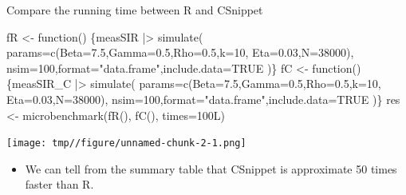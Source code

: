 \documentclass[
  ignorenonframetext,
  aspectratio=169,
  t]{beamer}
\newenvironment{Shaded}{\begin{snugshade}}{\end{snugshade}}
\newcommand{\AttributeTok}[1]{\textcolor[rgb]{0.40,0.45,0.13}{#1}}
\newcommand{\ConstantTok}[1]{\textcolor[rgb]{0.56,0.35,0.01}{#1}}
\newcommand{\ControlFlowTok}[1]{\textcolor[rgb]{0.00,0.23,0.31}{#1}}
\newcommand{\DecValTok}[1]{\textcolor[rgb]{0.68,0.00,0.00}{#1}}
\newcommand{\FloatTok}[1]{\textcolor[rgb]{0.68,0.00,0.00}{#1}}
\newcommand{\FunctionTok}[1]{\textcolor[rgb]{0.28,0.35,0.67}{#1}}
\newcommand{\NormalTok}[1]{\textcolor[rgb]{0.00,0.23,0.31}{#1}}
\newcommand{\OtherTok}[1]{\textcolor[rgb]{0.00,0.23,0.31}{#1}}
\newcommand{\SpecialCharTok}[1]{\textcolor[rgb]{0.37,0.37,0.37}{#1}}
\newcommand{\StringTok}[1]{\textcolor[rgb]{0.13,0.47,0.30}{#1}}
\providecommand{\tightlist}{%
  \setlength{\itemsep}{0pt}\setlength{\parskip}{0pt}}\usepackage{longtable,booktabs,array}
\theoremstyle{definition}
\begin{document}
\begin{frame}{Compare the running time between
R and CSnippet}
\label{compare-the-running-time-between-r-and-csnippet}
\begin{Shaded}
\begin{Highlighting}[]
\NormalTok{fR }\OtherTok{\textless{}{-}} \ControlFlowTok{function}\NormalTok{() \{measSIR }\SpecialCharTok{|\textgreater{}}
      \FunctionTok{simulate}\NormalTok{(}
        \AttributeTok{params=}\FunctionTok{c}\NormalTok{(}\AttributeTok{Beta=}\FloatTok{7.5}\NormalTok{,}\AttributeTok{Gamma=}\FloatTok{0.5}\NormalTok{,}\AttributeTok{Rho=}\FloatTok{0.5}\NormalTok{,}\AttributeTok{k=}\DecValTok{10}\NormalTok{,}
          \AttributeTok{Eta=}\FloatTok{0.03}\NormalTok{,}\AttributeTok{N=}\DecValTok{38000}\NormalTok{),}
        \AttributeTok{nsim=}\DecValTok{100}\NormalTok{,}\AttributeTok{format=}\StringTok{"data.frame"}\NormalTok{,}\AttributeTok{include.data=}\ConstantTok{TRUE}
\NormalTok{      )\} }
\NormalTok{fC }\OtherTok{\textless{}{-}} \ControlFlowTok{function}\NormalTok{() \{measSIR\_C }\SpecialCharTok{|\textgreater{}}
      \FunctionTok{simulate}\NormalTok{(}
        \AttributeTok{params=}\FunctionTok{c}\NormalTok{(}\AttributeTok{Beta=}\FloatTok{7.5}\NormalTok{,}\AttributeTok{Gamma=}\FloatTok{0.5}\NormalTok{,}\AttributeTok{Rho=}\FloatTok{0.5}\NormalTok{,}\AttributeTok{k=}\DecValTok{10}\NormalTok{,}
          \AttributeTok{Eta=}\FloatTok{0.03}\NormalTok{,}\AttributeTok{N=}\DecValTok{38000}\NormalTok{),}
        \AttributeTok{nsim=}\DecValTok{100}\NormalTok{,}\AttributeTok{format=}\StringTok{"data.frame"}\NormalTok{,}\AttributeTok{include.data=}\ConstantTok{TRUE}
\NormalTok{      )\} }
\NormalTok{res }\OtherTok{\textless{}{-}} \FunctionTok{microbenchmark}\NormalTok{(}\FunctionTok{fR}\NormalTok{(), }\FunctionTok{fC}\NormalTok{(), }\AttributeTok{times=}\DecValTok{100}\NormalTok{L)}
\end{Highlighting}
\end{Shaded}

\begin{center}
\texttt{[image: tmp//figure/unnamed-chunk-2-1.png]}
\end{center}

\begin{itemize}
\tightlist
\item
  We can tell from the summary table that CSnippet is approximate 50
  times faster than R.
\end{itemize}
\end{frame}
\end{document}
